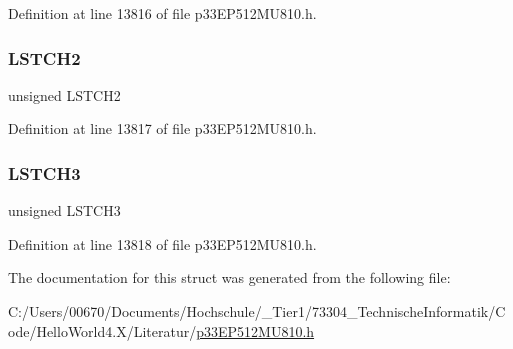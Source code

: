 Definition at line 13816 of file p33\+E\+P512\+M\+U810.\+h.

\mbox{\label{structtag_d_m_a_l_c_a_b_i_t_s_a4471a7966c29446aae6a60149c398485}} 
\subsubsection{\texorpdfstring{L\+S\+T\+C\+H2}{LSTCH2}}
{\footnotesize\ttfamily unsigned L\+S\+T\+C\+H2}



Definition at line 13817 of file p33\+E\+P512\+M\+U810.\+h.

\mbox{\label{structtag_d_m_a_l_c_a_b_i_t_s_a650afeb9fbb8556dd9328f31fe765604}} 
\subsubsection{\texorpdfstring{L\+S\+T\+C\+H3}{LSTCH3}}
{\footnotesize\ttfamily unsigned L\+S\+T\+C\+H3}



Definition at line 13818 of file p33\+E\+P512\+M\+U810.\+h.



The documentation for this struct was generated from the following file\+:\begin{DoxyCompactItemize}
\item 
C\+:/\+Users/00670/\+Documents/\+Hochschule/\+\_\+\+Tier1/73304\+\_\+\+Technische\+Informatik/\+Code/\+Hello\+World4.\+X/\+Literatur/\hyperlink{p33_e_p512_m_u810_8h}{p33\+E\+P512\+M\+U810.\+h}\end{DoxyCompactItemize}
